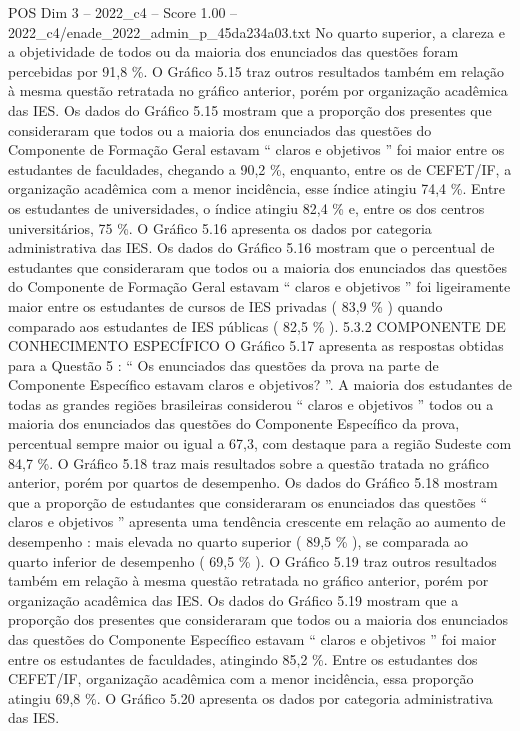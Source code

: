 \begin{textsample}{POS Dim 3 – 2022\_c4 – Score 1.00 – 2022\_c4/enade\_2022\_admin\_p\_45da234a03.txt}
No quarto superior, a clareza e a objetividade de todos ou da maioria dos enunciados das questões foram percebidas por 91,8 \%.
O Gráfico 5.15 traz outros resultados também em relação à mesma questão retratada no gráfico anterior, porém por organização acadêmica das IES.
Os dados do Gráfico 5.15 mostram que a proporção dos presentes que consideraram que todos ou a maioria dos enunciados das questões do Componente de Formação Geral estavam “ claros e objetivos ” foi maior entre os estudantes de faculdades, chegando a 90,2 \%, enquanto, entre os de CEFET/IF, a organização acadêmica com a menor incidência, esse índice atingiu 74,4 \%.
Entre os estudantes de universidades, o índice atingiu 82,4 \% e, entre os dos centros universitários, 75 \%.
O Gráfico 5.16 apresenta os dados por categoria administrativa das IES.
Os dados do Gráfico 5.16 mostram que o percentual de estudantes que consideraram que todos ou a maioria dos enunciados das questões do Componente de Formação Geral estavam “ claros e objetivos ” foi ligeiramente maior entre os estudantes de cursos de IES privadas ( 83,9 \% ) quando comparado aos estudantes de IES públicas ( 82,5 \% ). 5.3.2 COMPONENTE DE CONHECIMENTO ESPECÍFICO O Gráfico 5.17 apresenta as respostas obtidas para a Questão 5 : “ Os enunciados das questões da prova na parte de Componente Específico estavam claros e objetivos? ”.
A maioria dos estudantes de todas as grandes regiões brasileiras considerou “ claros e objetivos ” todos ou a maioria dos enunciados das questões do Componente Específico da prova, percentual sempre maior ou igual a 67,3, com destaque para a região Sudeste com 84,7 \%.
O Gráfico 5.18 traz mais resultados sobre a questão tratada no gráfico anterior, porém por quartos de desempenho.
Os dados do Gráfico 5.18 mostram que a proporção de estudantes que consideraram os enunciados das questões “ claros e objetivos ” apresenta uma tendência crescente em relação ao aumento de desempenho : mais elevada no quarto superior ( 89,5 \% ), se comparada ao quarto inferior de desempenho ( 69,5 \% ).
O Gráfico 5.19 traz outros resultados também em relação à mesma questão retratada no gráfico anterior, porém por organização acadêmica das IES.
Os dados do Gráfico 5.19 mostram que a proporção dos presentes que consideraram que todos ou a maioria dos enunciados das questões do Componente Específico estavam “ claros e objetivos ” foi maior entre os estudantes de faculdades, atingindo 85,2 \%.
Entre os estudantes dos CEFET/IF, organização acadêmica com a menor incidência, essa proporção atingiu 69,8 \%.
O Gráfico 5.20 apresenta os dados por categoria administrativa das IES.

\end{textsample}
